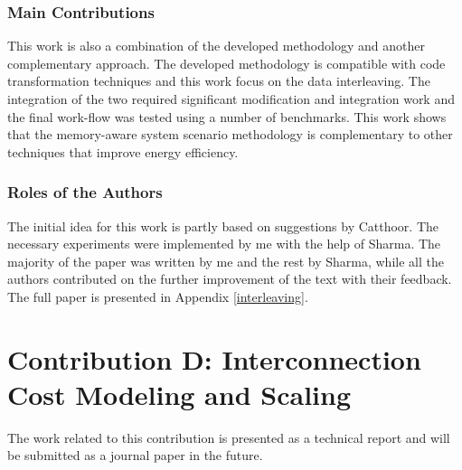\subsubsection{Main Contributions}

This work is also a combination of the developed methodology and another complementary approach.
The developed methodology is compatible with code transformation techniques and this work focus on the data interleaving.
The integration of the two required significant modification and integration work and the final work-flow was tested using a number of benchmarks.
This work shows that the memory-aware system scenario methodology is complementary to other techniques that improve energy efficiency.

\subsubsection{Roles of the Authors}

The initial idea for this work is partly based on suggestions by Catthoor. 
The necessary experiments were implemented by me with the help of Sharma.
The majority of the paper was written by me and the rest by Sharma, while all the authors contributed on the further improvement of the text with their feedback.
The full paper is presented in Appendix \ref{interleaving}.

\section{Contribution D: Interconnection Cost Modeling and Scaling}

The work related to this contribution is presented as a technical report and will be submitted as a journal paper in the future.

